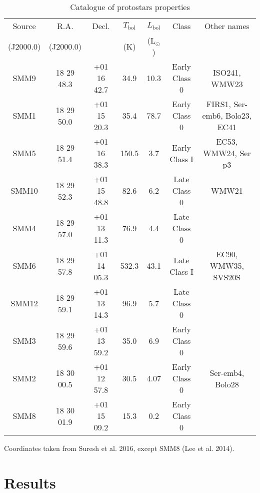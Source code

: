 \documentclass{aa}
\begin{document}
\begin{table*}
\caption{Catalogue of protostars properties}             %
\label{table:2}      %
\centering                          %
\begin{tabular}{c c c c c c c} 
\hline\hline 
Source & R.A. & Decl. & $T_\mathrm{bol}$ &  $L_\mathrm{bol}$  & Class & Other names\\
 (J2000.0) & (J2000.0) & & (K) & (L$_\odot$) & &\\
\hline  

SMM9 & 18 29 48.3 & +01 16 42.7 &  34.9 & 10.3 & Early Class 0 & ISO241, WMW23\\

SMM1 & 18 29 50.0 & +01 15 20.3 & 35.4 & 78.7 & Early Class 0 & FIRS1, Ser-emb6, Bolo23, EC41\\

SMM5 & 18 29 51.4 & +01 16 38.3 & 150.5 & 3.7 & Early Class I & EC53, WMW24, Ser p3 \\

SMM10 & 18 29 52.3 & +01 15 48.8 & 82.6 & 6.2 & Late Class 0 & WMW21\\

SMM4 & 18 29 57.0 & +01 13 11.3 & 76.9 & 4.4 & Late Class 0 &\\

SMM6 & 18 29 57.8 & +01 14 05.3 & 532.3 & 43.1 & Late Class I & EC90, WMW35, SVS20S \\

SMM12 & 18 29 59.1 & +01 13 14.3 & 96.9 & 5.7 & Late Class 0 &\\

SMM3 & 18 29 59.6 & +01 13 59.2 & 35.0 & 6.9 & Early Class 0 & \\

SMM2 & 18 30 00.5 & +01 12 57.8 & 30.5 & 4.07 & Early Class 0 & Ser-emb4, Bolo28\\

SMM8 & 18 30 01.9 & +01 15 09.2 & 15.3 & 0.2 & Early Class 0 &\\
\hline
\end{tabular}
\begin{flushleft}
Coordinates taken from Suresh et al. 2016, except SMM8 (Lee et al. 2014).\\
\end{flushleft}
\end{table*}

\section{Results}
\end{document}

